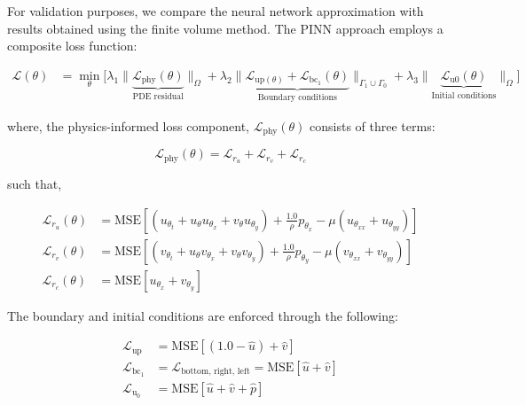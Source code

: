 \noindent For validation purposes, we compare the neural network approximation with results obtained using the finite volume method. The PINN approach employs a composite loss function:

\begin{equation*}
    \begin{split}
    \mathcal{L}(\theta) &=  \underset{\theta}{\min}\big[
    \lambda_1 \|\underbrace{\mathcal{L}_{\text{phy}}(\theta)}_{\text{PDE residual}}\|_{\Omega} 
    + \lambda_2 \|\underbrace{\mathcal{L}_{\text{up}(\theta)} + \mathcal{L}_{\text{bc}_1}(\theta)}_{\text{Boundary conditions}}\|_{\Gamma_1 \cup \Gamma_0} + \lambda_3 \|\underbrace{\mathcal{L}_{\text{u0}}(\theta)}_{\text{Initial conditions}}\|_{\Omega}  \big]
    \end{split}
\end{equation*}


\noindent where, the physics-informed loss component, $\mathcal{L}_{\mathrm{phy}}(\theta)$ consists of three terms:

\begin{equation*}
    \mathcal{L}_{\mathrm{phy}}(\theta) = \mathcal{L}_{r_u} + \mathcal{L}_{r_v} + \mathcal{L}_{r_c}
\end{equation*}

\noindent such that,

\begin{align*}
    \mathcal{L}_{r_u}(\theta) &= \text{MSE} \left[(u_{{\theta}_t} + u_{\theta} u_{{\theta}_x} + v_{\theta} u_{{\theta}_y}) + \frac{1.0}{\rho} p_{{\theta}_x} - \mu (u_{{\theta}_{xx}} + u_{{\theta}_{yy}})\right] \\
    \mathcal{L}_{r_v}(\theta) &= \text{MSE} \left[(v_{{\theta}_t} + u_{\theta} v_{{\theta}_x} + v_{\theta} v_{{\theta}_y}) + \frac{1.0}{\rho} p_{{\theta}_y} - \mu (v_{{\theta}_{xx}} + v_{{\theta}_{yy}})\right] \\
    \mathcal{L}_{r_c}(\theta) &= \text{MSE} \left[u_{{\theta}_x} + v_{{\theta}_y}\right] 
\end{align*}



\noindent The boundary and initial conditions are enforced through the following:

\begin{align*}
    \mathcal{L}_{\text{up}} &= \text{MSE}\left[(1.0 - \hat{u}) + \hat{v}\right] \\
    \mathcal{L}_{\text{bc}_{1}} &= \mathcal{L}_{\text{bottom, right, left}} = \text{MSE}\left[\hat{u} + \hat{v}\right] \\
    \mathcal{L}_{\text{u}_{0}} &= \text{MSE}\left[\hat{u} + \hat{v} + \hat{p}\right] \\
\end{align*}


